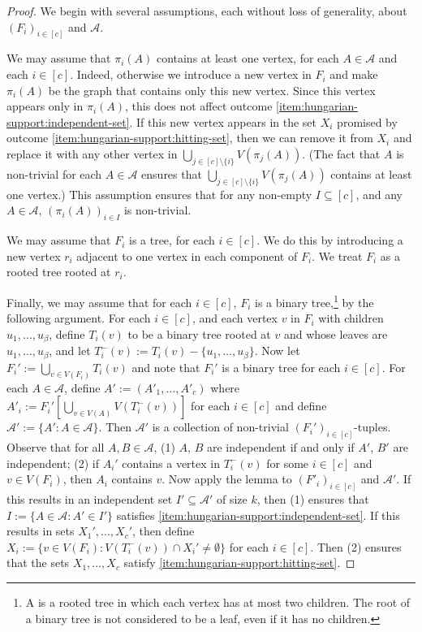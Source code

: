 \documentclass{patmorin}
\newcommand{\piotr}[1]{\textcolor{red}{Piotr: #1}}
\renewcommand{\mid}{:}  %
\begin{document}
\begin{proof}
We begin with several assumptions, each without loss of generality, about $(F_i)_{i\in[c]}$ and $\mathcal{A}$.

We may assume that $\pi_i(A)$ contains at least one vertex, for each $A\in\mathcal{A}$ and each $i\in[c]$.
Indeed, otherwise we introduce a new vertex in $F_i$ and make $\pi_i(A)$ be the graph that contains only this new vertex. Since this vertex appears only in $\pi_i(A)$, this does not affect outcome \cref{item:hungarian-support:independent-set}. If this new vertex appears in the set $X_i$ promised by outcome \cref{item:hungarian-support:hitting-set}, then we can remove it from $X_i$ and replace it with any other vertex in $\bigcup_{j\in[c]\setminus\{i\}}V(\pi_j(A))$.  (The fact that $A$ is non-trivial for each $A\in\mathcal{A}$ ensures that $\bigcup_{j\in[c]\setminus\{i\}}V(\pi_j(A))$ contains at least one vertex.)  This assumption ensures that for any non-empty $I\subseteq[c]$, and any $A\in\mathcal{A}$, $(\pi_i(A))_{i\in I}$ is non-trivial.

We may assume that $F_i$ is a tree, for each $i\in[c]$.  We do this by introducing a new vertex $r_i$ adjacent to one vertex in each component of $F_i$.  We treat $F_i$ as a rooted tree rooted at $r_i$.

Finally, we may assume that for each $i\in[c]$, $F_i$ is a binary tree,\footnote{A  is a rooted tree in which each vertex has at most two children. The root of a binary tree is not considered to be a leaf, even if it has no children.} by the following argument.
For each $i\in[c]$, and each vertex $v$ in $F_i$ with children $u_1,\ldots,u_\beta$, define $T_i(v)$ to be a binary tree rooted at $v$ and whose leaves are $u_1,\ldots,u_\beta$, and let $T^-_i(v):=T_i(v)-\{u_1,\ldots,u_\beta\}$.
Now let $F_i':=\bigcup_{v\in V(F_i)} T_i(v)$ and note that $F_i'$ is a binary tree for each $i\in[c]$.
For each $A\in\mathcal{A}$, define $A':=(A'_1,\ldots,A'_c)$ where $A'_i:=F_i'[\bigcup_{v\in V(A)} V(T^-_i(v))]$ for each $i\in [c]$ and define $\mathcal{A}':=\{A'\mid A\in\mathcal{A}\}$.  Then $\mathcal{A}'$ is a collection of non-trivial $(F_i')_{i\in[c]}$-tuples. Observe that for all $A,B\in\mathcal{A}$,
(1) $A$, $B$ are independent if and only if $A'$, $B'$ are independent;
(2) if $A_i'$ contains a vertex in $T_i^-(v)$ for some $i\in[c]$ and $v\in V(F_i)$, then $A_i$ contains $v$.  Now apply the lemma to $(F'_i)_{i\in[c]}$ and $\mathcal{A}'$.  If this results in an independent set $I'\subseteq\mathcal{A}'$ of size $k$, then (1) ensures that $I:=\{A\in\mathcal{A}\mid A'\in I'\}$ satisfies \cref{item:hungarian-support:independent-set}.  If this results in sets $X_1',\ldots,X_c'$, then define $X_i:=\{v\in V(F_i)\mid V(T_i^-(v))\cap X_i'\neq\emptyset\}$ for each $i\in[c]$.  Then (2) ensures that the sets $X_1,\ldots,X_c$ satisfy \cref{item:hungarian-support:hitting-set}.



\end{proof}
\end{document}
